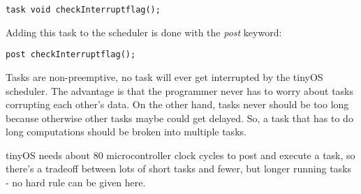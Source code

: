 \lstset{language=C}
\begin{lstlisting}
task void checkInterruptflag();
\end{lstlisting}

Adding this task to the scheduler is done with the \textit{post} keyword: 

\lstset{language=C}
\begin{lstlisting}
post checkInterruptflag();
\end{lstlisting}

Tasks are non-preemptive, no task will ever get interrupted by the tinyOS scheduler. The advantage is that the programmer never has to worry about tasks corrupting each other's data. On the other hand, tasks never should be too long because otherwise other tasks maybe could get delayed. So, a task that has to do long computations should be broken into multiple tasks.

tinyOS needs about 80 microcontroller clock cycles to post and execute a task, so there's a tradeoff between lots of short tasks and fewer, but longer running tasks - no hard rule can be given here. 


